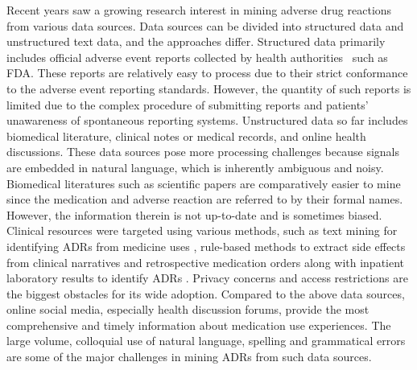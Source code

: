 Recent years saw a growing research interest in mining adverse drug reactions from various data sources. Data sources can be divided into structured data and unstructured text data, and the approaches differ. Structured data primarily includes official adverse event reports collected by health authorities~\citep{harpaz2010statistical,harpaz2012novel,hahn2012mining,gurulingappa2013automatic} such as
FDA. These reports are relatively easy to process due to their strict conformance to the adverse event reporting standards. However, the quantity of such reports is limited due to the complex procedure of submitting reports and patients' unawareness of spontaneous reporting systems. Unstructured data so far includes biomedical literature, clinical notes or medical records, and online health discussions. These data sources pose more processing challenges because signals are embedded in natural language, which is inherently ambiguous and noisy. Biomedical literatures such as scientific papers are comparatively easier to mine \citep{wang2011drug,yang2012automatic} since the medication and adverse reaction are referred to by their formal names. However, the information therein is not up-to-date and is sometimes biased. Clinical resources were targeted using various methods, such as text mining for identifying ADRs from medicine uses \citep{warrer2012using}, rule-based methods to extract side effects from clinical narratives \citep{sohn2011drug} and retrospective medication orders along with inpatient laboratory results to identify ADRs \citep{liu2013azdrugminer}. Privacy concerns and access restrictions are the biggest obstacles for its wide adoption. Compared to the above data sources, online social media, especially health discussion forums, provide the most comprehensive and timely information about medication use experiences. The large volume, colloquial use of natural language, spelling and grammatical errors are some of the major challenges in mining ADRs from such data sources. 

